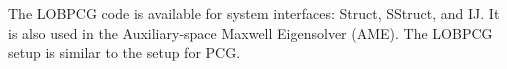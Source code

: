 The LOBPCG code is available for system interfaces: Struct, SStruct, and IJ.  It
is also used in the Auxiliary-space Maxwell Eigensolver (AME).  The LOBPCG setup
is similar to the setup for PCG.



